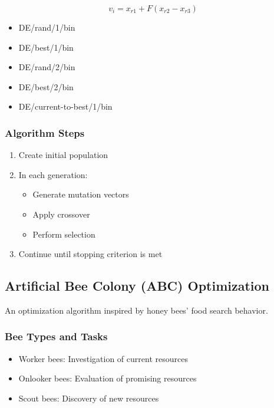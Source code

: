 \begin{equation}
v_i = x_{r1} + F(x_{r2} - x_{r3})
\end{equation}

\begin{tcolorbox}[title=DE Strategies]
\begin{itemize}
    \item DE/rand/1/bin
    \item DE/best/1/bin
    \item DE/rand/2/bin
    \item DE/best/2/bin
    \item DE/current-to-best/1/bin
\end{itemize}
\end{tcolorbox}

\subsubsection{Algorithm Steps}
\begin{enumerate}
    \item Create initial population
    \item In each generation:
        \begin{itemize}
            \item Generate mutation vectors
            \item Apply crossover
            \item Perform selection
        \end{itemize}
    \item Continue until stopping criterion is met
\end{enumerate}


\subsection{Artificial Bee Colony (ABC) Optimization}
An optimization algorithm inspired by honey bees' food search behavior.

\subsubsection{Bee Types and Tasks}
\begin{itemize}
    \item Worker bees: Investigation of current resources
    \item Onlooker bees: Evaluation of promising resources
    \item Scout bees: Discovery of new resources
\end{itemize}

